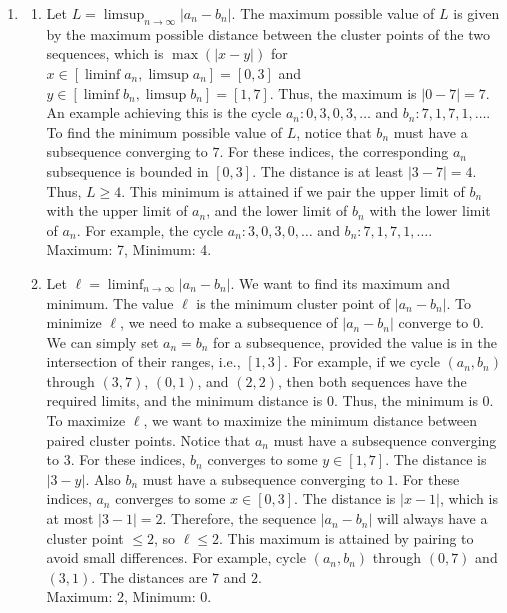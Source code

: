 \documentclass{article}
\begin{document}
\begin{enumerate}[label=\fbox{\arabic*}]
  \item %
        \begin{enumerate}[label=(\arabic*)]
          \item Let $L = \limsup_{n \to \infty} |a_n - b_n|$. The maximum possible value of $L$ is given by the maximum possible distance between the cluster points of the two sequences, which is $\max(|x-y|)$ for $x \in [\liminf a_n, \limsup a_n] = [0, 3]$ and $y \in [\liminf b_n, \limsup b_n] = [1, 7]$. Thus, the maximum is $|0 - 7| = 7$. An example achieving this is the cycle $a_n: 0, 3, 0, 3, \dots$ and $b_n: 7, 1, 7, 1, \dots$. \\
          To find the minimum possible value of $L$, notice that $b_n$ must have a subsequence converging to $7$. For these indices, the corresponding $a_n$ subsequence is bounded in $[0, 3]$. The distance is at least $|3 - 7| = 4$. Thus, $L \ge 4$. This minimum is attained if we pair the upper limit of $b_n$ with the upper limit of $a_n$, and the lower limit of $b_n$ with the lower limit of $a_n$. For example, the cycle $a_n: 3, 0, 3, 0, \dots$ and $b_n: 7, 1, 7, 1, \dots$. \\
          Maximum: 7, Minimum: 4.
          \item Let $\ell = \liminf_{n \to \infty} |a_n - b_n|$. We want to find its maximum and minimum. The value $\ell$ is the minimum cluster point of $|a_n - b_n|$. 
          To minimize $\ell$, we need to make a subsequence of $|a_n - b_n|$ converge to $0$. We can simply set $a_n = b_n$ for a subsequence, provided the value is in the intersection of their ranges, i.e., $[1, 3]$. For example, if we cycle $(a_n, b_n)$ through $(3, 7)$, $(0, 1)$, and $(2, 2)$, then both sequences have the required limits, and the minimum distance is $0$. Thus, the minimum is $0$. \\
          To maximize $\ell$, we want to maximize the minimum distance between paired cluster points. Notice that $a_n$ must have a subsequence converging to $3$. For these indices, $b_n$ converges to some $y \in [1, 7]$. The distance is $|3-y|$. Also $b_n$ must have a subsequence converging to $1$. For these indices, $a_n$ converges to some $x \in [0, 3]$. The distance is $|x-1|$, which is at most $|3-1| = 2$. Therefore, the sequence $|a_n - b_n|$ will always have a cluster point $\le 2$, so $\ell \le 2$. This maximum is attained by pairing to avoid small differences. For example, cycle $(a_n, b_n)$ through $(0, 7)$ and $(3, 1)$. The distances are $7$ and $2$. \\
          Maximum: 2, Minimum: 0.
        \end{enumerate}


\end{enumerate}
\end{document}
